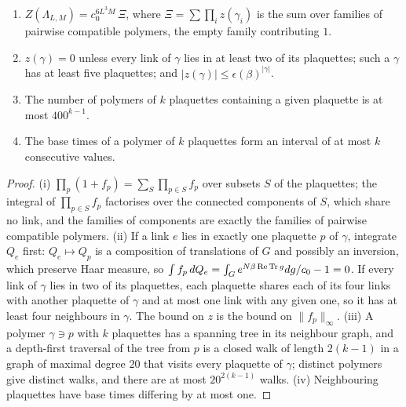 \begin{lemma}[polymers]\label{lem:polymers}
\begin{enumerate}[label=\textup{(\roman*)},leftmargin=*]
\item $Z(\Lambda_{L,M})=c_0^{6L^3M}\,\Xi$, where $\Xi=\sum\prod_iz(\gamma_i)$
is the sum over families of pairwise compatible polymers, the empty family
contributing $1$.
\item $z(\gamma)=0$ unless every link of $\gamma$ lies in at least two of its
plaquettes; such a $\gamma$ has at least five plaquettes; and
$|z(\gamma)|\le\epsilon(\beta)^{|\gamma|}$.
\item The number of polymers of $k$ plaquettes containing a given plaquette
is at most $400^{k-1}$.
\item The base times of a polymer of $k$ plaquettes form an interval of at
most $k$ consecutive values.
\end{enumerate}
\end{lemma}

\begin{proof}
(i) $\prod_p(1+f_p)=\sum_{S}\prod_{p\in S}f_p$ over subsets $S$ of the
plaquettes; the integral of $\prod_{p\in S}f_p$ factorises over the
connected components of $S$, which share no link, and the families of
components are exactly the families of pairwise compatible polymers.
(ii) If a link $e$ lies in exactly one plaquette $p$ of $\gamma$, integrate
$Q_e$ first: $Q_e\mapsto Q_p$ is a composition of translations of $G$ and
possibly an inversion, which preserve Haar measure, so $\int f_p\,dQ_e=
\int_Ge^{N\beta\operatorname{Re}\operatorname{Tr} g}dg/c_0-1=0$. If every link of $\gamma$ lies in two of
its plaquettes, each plaquette shares each of its four links with another
plaquette of $\gamma$ and at most one link with any given one, so it has at
least four neighbours in $\gamma$. The bound on $z$ is the bound on
$\|f_p\|_\infty$. (iii) A polymer $\gamma\ni p$ with $k$ plaquettes has a
spanning tree in its neighbour graph, and a depth-first traversal of the
tree from $p$ is a closed walk of length $2(k-1)$ in a graph of maximal
degree $20$ that visits every plaquette of $\gamma$; distinct polymers give
distinct walks, and there are at most $20^{2(k-1)}$ walks. (iv) Neighbouring
plaquettes have base times differing by at most one.
\end{proof}

